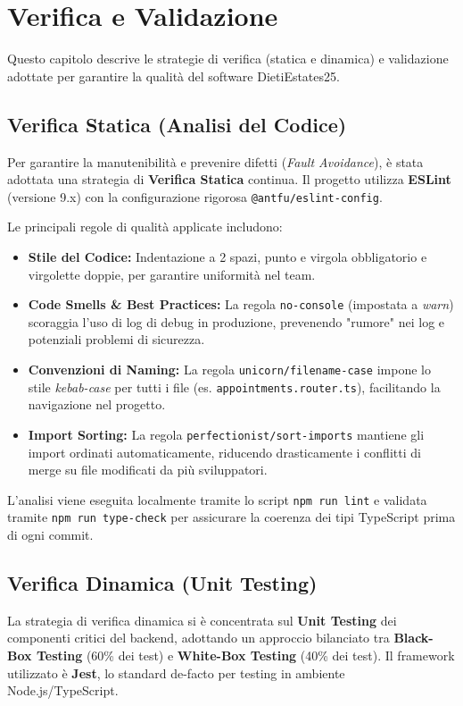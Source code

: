 \chapter{Verifica e Validazione}
\label{cap:testing}

Questo capitolo descrive le strategie di verifica (statica e dinamica) e validazione adottate per garantire la qualità del software DietiEstates25.

\section{Verifica Statica (Analisi del Codice)}
Per garantire la manutenibilità e prevenire difetti (\textit{Fault Avoidance}), è stata adottata una strategia di \textbf{Verifica Statica} continua.
Il progetto utilizza \textbf{ESLint} (versione 9.x) con la configurazione rigorosa \texttt{@antfu/eslint-config}.

Le principali regole di qualità applicate includono:
\begin{itemize}
    \item \textbf{Stile del Codice:} Indentazione a 2 spazi, punto e virgola obbligatorio e virgolette doppie, per garantire uniformità nel team.
    \item \textbf{Code Smells \& Best Practices:} La regola \texttt{no-console} (impostata a \textit{warn}) scoraggia l'uso di log di debug in produzione, prevenendo "rumore" nei log e potenziali problemi di sicurezza.
    \item \textbf{Convenzioni di Naming:} La regola \texttt{unicorn/filename-case} impone lo stile \textit{kebab-case} per tutti i file (es. \texttt{appointments.router.ts}), facilitando la navigazione nel progetto.
    \item \textbf{Import Sorting:} La regola \texttt{perfectionist/sort-imports} mantiene gli import ordinati automaticamente, riducendo drasticamente i conflitti di merge su file modificati da più sviluppatori.
\end{itemize}
L'analisi viene eseguita localmente tramite lo script \texttt{npm run lint} e validata tramite \texttt{npm run type-check} per assicurare la coerenza dei tipi TypeScript prima di ogni commit.


\section{Verifica Dinamica (Unit Testing)}
La strategia di verifica dinamica si è concentrata sul \textbf{Unit Testing} dei componenti critici del backend, adottando un approccio bilanciato tra \textbf{Black-Box Testing} (60\% dei test) e \textbf{White-Box Testing} (40\% dei test). Il framework utilizzato è \textbf{Jest}, lo standard de-facto per testing in ambiente Node.js/TypeScript.


